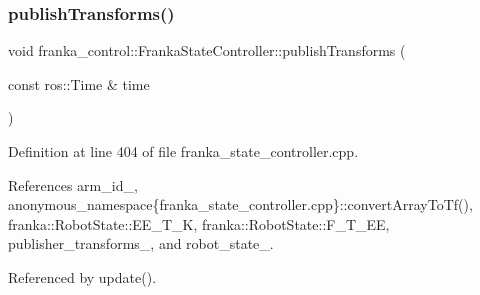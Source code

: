\subsubsection{\texorpdfstring{publish\+Transforms()}{publishTransforms()}}
{\footnotesize\ttfamily void franka\+\_\+control\+::\+Franka\+State\+Controller\+::publish\+Transforms (\begin{DoxyParamCaption}\item[{const ros\+::\+Time \&}]{time }\end{DoxyParamCaption})\hspace{0.3cm}{\ttfamily [private]}}



Definition at line 404 of file franka\+\_\+state\+\_\+controller.\+cpp.



References arm\+\_\+id\+\_\+, anonymous\+\_\+namespace\{franka\+\_\+state\+\_\+controller.\+cpp\}\+::convert\+Array\+To\+Tf(), franka\+::\+Robot\+State\+::\+E\+E\+\_\+\+T\+\_\+K, franka\+::\+Robot\+State\+::\+F\+\_\+\+T\+\_\+\+EE, publisher\+\_\+transforms\+\_\+, and robot\+\_\+state\+\_\+.



Referenced by update().



